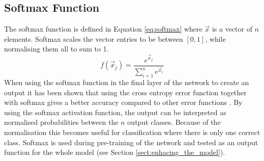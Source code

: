 \subsection{Softmax Function}\label{sec:softmax_function}
The softmax function is defined in Equation \ref{eq:softmax} where $\vec{x}$ is a vector of $n$ elements. Softmax scales the vector entries to be between $[0,1]$, while normalising them all to sum to 1.
\begin{equation} \label{eq:softmax}
    f(\vec{x}_j) = \frac{e^{\vec{x}_j}}{\sum_{i=1}^{n} e^{\vec{x}_i}}
\end{equation}
When using the softmax function in the final layer of the network to create an output it has been shown that using the cross entropy error function together with softmax gives a better accuracy compared to other error functions \parencite{dunne1997pairing,golik2013cross}. By using the softmax activation function, the output can be interpreted as normalised probabilities between the $n$ output classes. Because of the normalisation this becomes useful for classification where there is only one correct class. Softmax is used during pre-training of the network and tested as an output function for the whole model (see Section \ref{sect:enhacing_the_model}).

